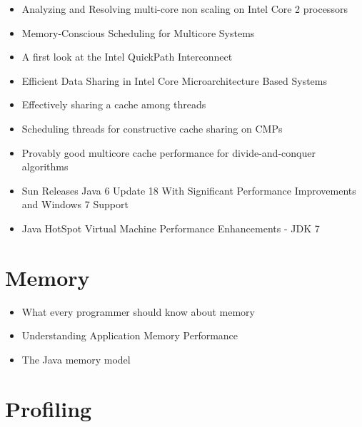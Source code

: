 \begin{itemize}
\item[\textbullet] Analyzing and Resolving multi-core non scaling on
  Intel Core 2 processors \cite{Levinthal2007}
\item[\textbullet] Memory-Conscious Scheduling for Multicore Systems
  \cite{Majo2010}
\item[\textbullet] A first look at the Intel QuickPath Interconnect
  \cite{Maddox2009}
\item[\textbullet] Efficient Data Sharing in Intel
  \textsuperscript{\textregistered} Core Microarchitecture Based
  Systems \cite{Shemer2007}
\item[\textbullet] Effectively sharing a cache among threads
  \cite{Blelloch2004}
\item[\textbullet] Scheduling threads for constructive cache sharing
  on CMPs \cite{Chen2007}
\item[\textbullet] Provably good multicore cache performance for
  divide-and-conquer algorithms \cite{Blelloch2008}
\item[\checkmark] Sun Releases Java 6 Update 18 With Significant
  Performance Improvements and Windows 7 Support \cite{Humble2010}
\item[\checkmark] Java HotSpot Virtual Machine Performance
  Enhancements - JDK 7 \cite{Oracle2010}
\end{itemize}


\section*{Memory}
\label{sec:lr-memory}

\begin{itemize}
\item[\textbullet] What every programmer should know about memory
  \cite{Drepper2007}
\item[\textbullet] Understanding Application Memory Performance
  \cite{Drepper2008}
\item[\textbullet] The Java memory model \cite{Manson2005}
\end{itemize}


\section*{Profiling}
\label{sec:lr-profiling}

